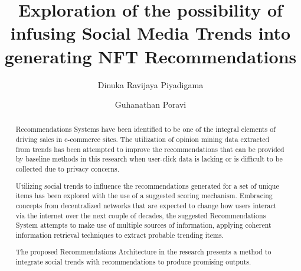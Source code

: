 \documentclass[manuscript,natbib=false]{acmart}
\begin{document}
\title[NFT-Trends-RecSys]{Exploration of the possibility of infusing Social Media Trends into generating NFT Recommendations}

\author{Dinuka Ravijaya Piyadigama}

\author{Guhanathan Poravi}



\begin{abstract}
Recommendations Systems have been identified to be one of the integral elements of driving sales in e-commerce sites. The utilization of opinion mining data extracted from trends has been attempted to improve the recommendations that can be provided by baseline methods in this research when user-click data is lacking or is difficult to be collected due to privacy concerns.

Utilizing social trends to influence the recommendations generated for a set of unique items has been explored with the use of a suggested scoring mechanism. Embracing concepts from decentralized networks that are expected to change how users interact via the internet over the next couple of decades, the suggested Recommendations System attempts to make use of multiple sources of information, applying coherent information retrieval techniques to extract probable trending items.

The proposed Recommendations Architecture in the research presents a method to integrate social trends with recommendations to produce promising outputs.
\end{abstract}
\end{document}
